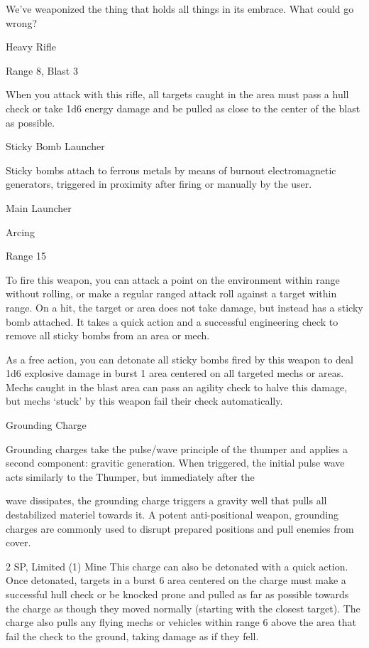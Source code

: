 We’ve weaponized the thing that holds all things in its embrace. What could go wrong?

Heavy Rifle

Range 8, Blast 3

When you attack with this rifle, all targets caught in the area must pass a hull check or take 1d6
energy damage and be pulled as close to the center of the blast as possible.


Sticky Bomb Launcher

Sticky bombs attach to ferrous metals by means of burnout electromagnetic generators, triggered in
proximity after firing or manually by the user.

Main Launcher

Arcing

Range 15

To fire this weapon, you can attack a point on the environment within range without rolling, or
make a regular ranged attack roll against a target within range. On a hit, the target or area does
not take damage, but instead has a sticky bomb attached. It takes a quick action and a
successful engineering check to remove all sticky bombs from an area or mech.

As a free action, you can detonate all sticky bombs fired by this weapon to deal 1d6 explosive
damage in burst 1 area centered on all targeted mechs or areas. Mechs caught in the blast area
can pass an agility check to halve this damage, but mechs `stuck' by this weapon fail their check
automatically.


Grounding Charge

Grounding charges take the pulse/wave principle of the thumper and applies a second component: gravitic
generation. When triggered, the initial pulse wave acts similarly to the Thumper, but immediately after the

wave dissipates, the grounding charge triggers a gravity well that pulls all destabilized materiel towards it. A
potent anti-positional weapon, grounding charges are commonly used to disrupt prepared positions and
pull enemies from cover.

2 SP, Limited (1)
Mine
This charge can also be detonated with a quick action. Once detonated, targets in a burst 6 area
centered on the charge must make a successful hull check or be knocked prone and pulled as
far as possible towards the charge as though they moved normally (starting with the closest
target). The charge also pulls any flying mechs or vehicles within range 6 above the area that fail
the check to the ground, taking damage as if they fell.

